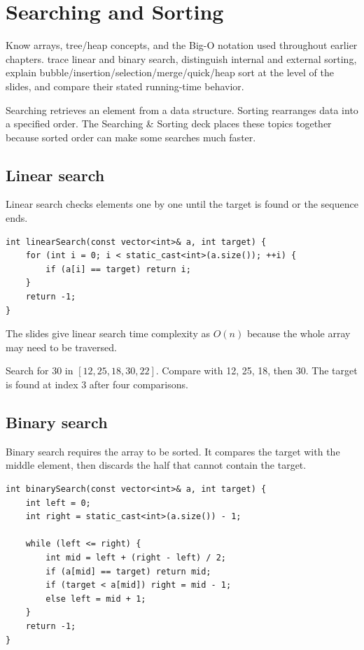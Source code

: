 \chapter{Searching and Sorting}
\label{ch:search-sort}

\chapterguide%
  {Know arrays, tree/heap concepts, and the Big-O notation used throughout earlier chapters.}
  {trace linear and binary search, distinguish internal and external sorting, explain bubble/insertion/selection/merge/quick/heap sort at the level of the slides, and compare their stated running-time behavior.}

Searching retrieves an element from a data structure. Sorting rearranges data into a specified order. The Searching \& Sorting deck places these topics together because sorted order can make some searches much faster.

\section{Linear search}

Linear search checks elements one by one until the target is found or the sequence ends.

\begin{lstlisting}
int linearSearch(const vector<int>& a, int target) {
    for (int i = 0; i < static_cast<int>(a.size()); ++i) {
        if (a[i] == target) return i;
    }
    return -1;
}
\end{lstlisting}

The slides give linear search time complexity as $O(n)$ because the whole array may need to be traversed.

\begin{workedexample}
Search for 30 in $[12,25,18,30,22]$. Compare with 12, 25, 18, then 30. The target is found at index 3 after four comparisons.
\end{workedexample}

\section{Binary search}

Binary search requires the array to be sorted. It compares the target with the middle element, then discards the half that cannot contain the target.

\begin{lstlisting}
int binarySearch(const vector<int>& a, int target) {
    int left = 0;
    int right = static_cast<int>(a.size()) - 1;

    while (left <= right) {
        int mid = left + (right - left) / 2;
        if (a[mid] == target) return mid;
        if (target < a[mid]) right = mid - 1;
        else left = mid + 1;
    }
    return -1;
}
\end{lstlisting}

